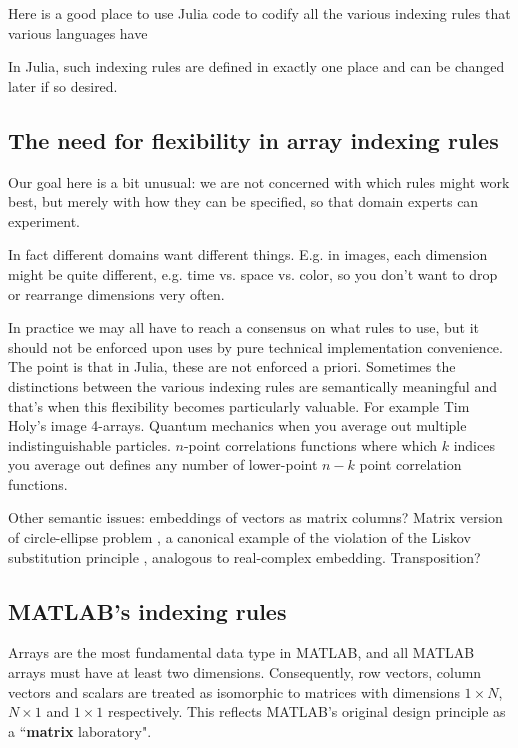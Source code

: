 \documentclass[preprint]{sigplanconf}
\newcommand{\MATLAB}{\textsc{MATLAB}}
\begin{document}
Here is a good place to use Julia code to codify all the various indexing
rules that various languages have

In Julia, such indexing rules are defined in exactly one place and
can be changed later if so desired.

\subsection{The need for flexibility in array indexing rules}

Our goal here is a bit unusual: we are not concerned with which rules
might work best, but merely with how they can be specified, so that
domain experts can experiment.

In fact different domains want different things. E.g. in images, each
dimension might be quite different, e.g. time vs. space vs. color,
so you don't want to drop or rearrange dimensions very often.

In practice we may all have to reach a consensus on what rules to
use, but it should not be enforced upon uses by pure technical implementation
convenience. The point is that in Julia, these are not enforced a
priori. Sometimes the distinctions between the various indexing rules
are semantically meaningful and that's when this flexibility becomes
particularly valuable. For example Tim Holy's image 4-arrays. Quantum
mechanics when you average out multiple indistinguishable particles.
$n$-point correlations functions where which $k$ indices you average out defines
any number of lower-point $n-k$ point correlation functions.

Other semantic issues: embeddings of vectors as matrix columns? Matrix version
of circle-ellipse problem \cite{Halbert:1987ut}, a canonical example of the violation of the Liskov substitution principle \cite{Liskov:1987da}, analogous to real-complex embedding. Transposition?

\subsection{\MATLAB's indexing rules}

Arrays are the most fundamental data type in \MATLAB{}, and all \MATLAB{} arrays must have at least two dimensions. Consequently, row vectors, column vectors and scalars are treated as isomorphic to matrices with dimensions $1\times N$, $N\times1$ and $1\times1$ respectively. This reflects \MATLAB's original design principle as a ``\textbf{matrix} laboratory".
\end{document}
